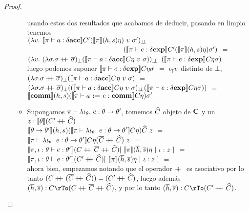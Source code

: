 \begin{proof}
\begin{itemize}
\begin{itemize}
usando estos dos resultados que acabamos de deducir, pasando en limpio tenemos\\

$(\lambda v. \ 
	\semBrcks{\pi \vdash a : \deltaacc}C'(\semBrcks{\pi}(h,s)\eta)\ v \ \sigma')_{\dbot}$\\
\indent \ \ \ \ \ \ \ \ \ \ \ \ \ \ \ \ \ \ \ \ \ \ \ \ \ \ \ \
$(\llbracket \pi \vdash e : \delta \textbf{exp} \rrbracket C'(\llbracket \pi \rrbracket(h,s)\eta)\sigma')$ $=$\\
$(\lambda v. \ (\lambda \sigma . \sigma \concat \sigmaover)_{\bot}
				(\semBrcks{\pi \vdash a : \deltaacc} C \eta \ v \ \sigma))_{\dbot}$
$(\llbracket \pi \vdash e : \delta \textbf{exp} \rrbracket C \eta \sigma)$ \\

luego podemos suponer $\llbracket \pi \vdash e : \delta \textbf{exp} \rrbracket C \eta \sigma$ $=$ $\iota_{\uparrow} v$ distinto
de $\bot$,\\

$(\lambda \sigma . \sigma \concat \sigmaover)_{\bot}
				(\semBrcks{\pi \vdash a : \deltaacc} C \eta \ v \ \sigma)$ $=$\\
$(\lambda \sigma . \sigma +\kern-1.3ex+\kern0.8ex \overline{\sigma})_{\bot}
	((\llbracket \pi \vdash a : \delta \textbf{acc} \rrbracket C \eta \ v \ \sigma)_{\bot \!\!\! \bot}
			(\llbracket \pi \vdash e : \delta \textbf{exp} \rrbracket C \eta \sigma))$ $=$\\
$\llbracket \textbf{comm} \rrbracket(h,s)(\llbracket \pi \vdash a \ \textbf{:=} \ e : \textbf{comm} \rrbracket C\eta)\sigma'$\\

\item Supongamos $\pi \vdash \lambda \iota_{\theta} . \ e : \theta \rightarrow \theta'$, tomemos
$\widehat{C}$ objeto de $\textbf{C}$ y un $z : \llbracket \theta \rrbracket(C'+\kern-1.3ex+\kern0.8ex\widehat{C})$ \\

$\llbracket \theta \rightarrow \theta' \rrbracket(h,s)
(\llbracket \pi \vdash 
	\lambda \iota_{\theta} . \ e : \theta \rightarrow \theta' \rrbracket C \eta)\widehat{C} \ z$ $=$\\
$\llbracket \pi \vdash \lambda \iota_{\theta} . \ e : \theta \rightarrow \theta' \rrbracket C 
	\eta (\overline{C} +\kern-1.3ex+\kern0.8ex \widehat{C}) \ z$ $=$\\
$\llbracket \pi,\iota:\theta \vdash e : \theta' \rrbracket
	(C +\kern-1.3ex+\kern0.8ex \overline{C} +\kern-1.3ex+\kern0.8ex \widehat{C})
	[ \ \llbracket \pi \rrbracket(\overline{h},\overline{s})\eta \ | \ \iota:z \ ]$ $=$\\
$\llbracket \pi,\iota:\theta \vdash e : \theta' \rrbracket
	(C' +\kern-1.3ex+\kern0.8ex \widehat{C})
	[ \ \llbracket \pi \rrbracket(\overline{h},\overline{s})\eta \ | \ \iota:z \ ]$ $=$\\

ahora bien, empezamos notando que el operador $+\kern-1.3ex+\kern0.8ex$ es asociativo por lo tanto
$(C +\kern-1.3ex+\kern0.8ex (\overline{C} +\kern-1.3ex+\kern0.8ex \widehat{C})) = (C' +\kern-1.3ex+\kern0.8ex \widehat{C})$, luego adem\'as
$(\hover,\sover) : C \rTo (C \concat \Cover \concat \Chat)$, y por lo tanto
$(\hover,\sover) : C \rTo (C' \concat \Chat)$.\\


\end{itemize}
\end{itemize}
\end{proof}
